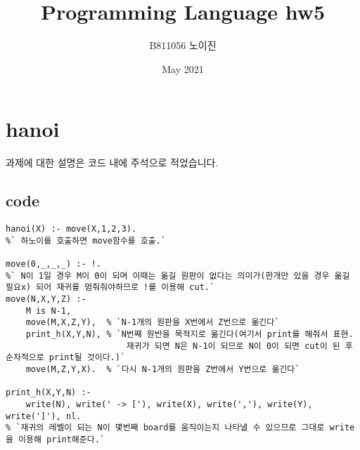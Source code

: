 \documentclass{article}
\title{Programming Language hw5}
\author{B811056 노이진}
\date{May 2021}
\begin{document}
\maketitle

\section{hanoi}
과제에 대한 설명은 코드 내에 주석으로 적었습니다.
\subsection{code}
\begin{lstlisting}[escapeinside=``]
hanoi(X) :- move(X,1,2,3).
%` 하노이를 호출하면 move함수를 호출.`

move(0,_,_,_) :- !.
%` N이 1일 경우 M이 0이 되며 이때는 옮길 원판이 없다는 의미가(한개만 있을 경우 옮길 필요x) 되어 재귀를 멈춰줘야하므로 !를 이용해 cut.`
move(N,X,Y,Z) :-
	M is N-1,
	move(M,X,Z,Y),  % `N-1개의 원판을 X번에서 Z번으로 옮긴다`
	print_h(X,Y,N), % `N번째 원반을 목적지로 옮긴다(여기서 print를 해줘서 표현. 
	                    재귀가 되면 N은 N-1이 되므로 N이 0이 되면 cut이 된 후 순차적으로 print될 것이다.)`
	move(M,Z,Y,X).  % `다시 N-1개의 원판을 Z번에서 Y번으로 옮긴다`
	
print_h(X,Y,N) :-
	write(N), write(' -> ['), write(X), write(','), write(Y), write(']'), nl.
% `재귀의 레벨이 되는 N이 몇번째 board를 움직이는지 나타낼 수 있으므로 그대로 write을 이용해 print해준다.`
\end{lstlisting}
\end{document}
